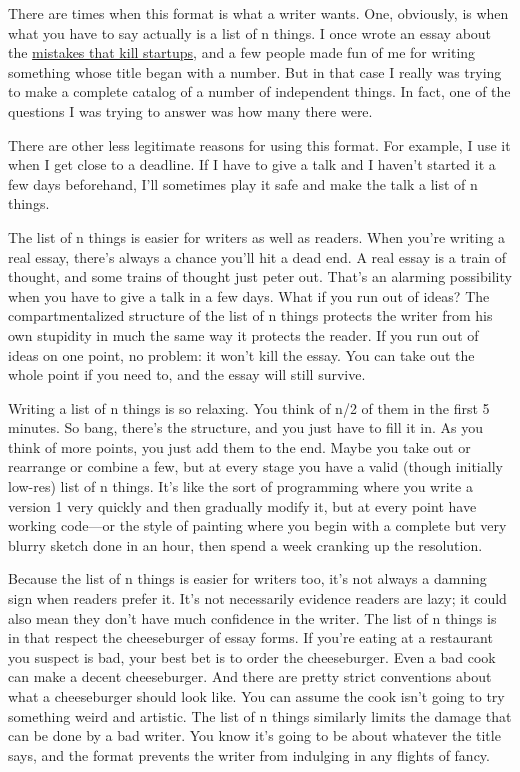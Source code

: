 There are times when this format is what a writer wants. One, obviously,
is when what you have to say actually is a list of n things. I once
wrote an essay about the \href{startupmistakes.html}{mistakes that kill
startups}, and a few people made fun of me for writing something whose
title began with a number. But in that case I really was trying to make
a complete catalog of a number of independent things. In fact, one of
the questions I was trying to answer was how many there were.

There are other less legitimate reasons for using this format. For
example, I use it when I get close to a deadline. If I have to give a
talk and I haven't started it a few days beforehand, I'll sometimes play
it safe and make the talk a list of n things.

The list of n things is easier for writers as well as readers. When
you're writing a real essay, there's always a chance you'll hit a dead
end. A real essay is a train of thought, and some trains of thought just
peter out. That's an alarming possibility when you have to give a talk
in a few days. What if you run out of ideas? The compartmentalized
structure of the list of n things protects the writer from his own
stupidity in much the same way it protects the reader. If you run out of
ideas on one point, no problem: it won't kill the essay. You can take
out the whole point if you need to, and the essay will still survive.

Writing a list of n things is so relaxing. You think of n/2 of them in
the first 5 minutes. So bang, there's the structure, and you just have
to fill it in. As you think of more points, you just add them to the
end. Maybe you take out or rearrange or combine a few, but at every
stage you have a valid (though initially low-res) list of n things. It's
like the sort of programming where you write a version 1 very quickly
and then gradually modify it, but at every point have working code---or
the style of painting where you begin with a complete but very blurry
sketch done in an hour, then spend a week cranking up the resolution.

Because the list of n things is easier for writers too, it's not always
a damning sign when readers prefer it. It's not necessarily evidence
readers are lazy; it could also mean they don't have much confidence in
the writer. The list of n things is in that respect the cheeseburger of
essay forms. If you're eating at a restaurant you suspect is bad, your
best bet is to order the cheeseburger. Even a bad cook can make a decent
cheeseburger. And there are pretty strict conventions about what a
cheeseburger should look like. You can assume the cook isn't going to
try something weird and artistic. The list of n things similarly limits
the damage that can be done by a bad writer. You know it's going to be
about whatever the title says, and the format prevents the writer from
indulging in any flights of fancy.

